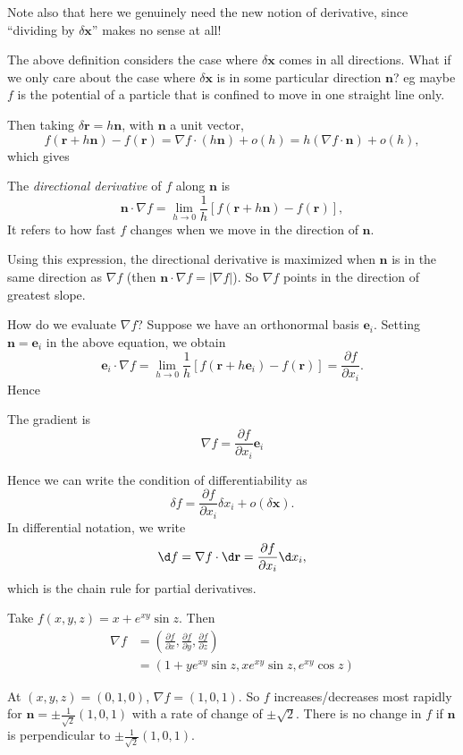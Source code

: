 \documentclass[a4paper]{article}
\begin{document}
Note also that here we genuinely need the new notion of derivative, since ``dividing by $\delta \mathbf{x}$'' makes no sense at all!

The above definition considers the case where $\delta \mathbf{x}$ comes in all directions. What if we only care about the case where $\delta \mathbf{x}$ is in some particular direction $\mathbf{n}$? eg maybe $f$ is the potential of a particle that is confined to move in one straight line only.

Then taking $\delta \mathbf{r} = h\mathbf{n}$, with $\mathbf{n}$ a unit vector,
\[
  f(\mathbf{r} + h\mathbf{n}) - f(\mathbf{r}) = \nabla f \cdot (h\mathbf{n}) + o(h) = h(\nabla f\cdot \mathbf{n}) + o(h),
\]
which gives
\begin{defi}
  The \emph{directional derivative} of $f$ along $\mathbf{n}$ is
  \[
    \mathbf{n}\cdot \nabla f = \lim_{h \to 0} \frac{1}{h}[f(\mathbf{r} + h\mathbf{n}) - f(\mathbf{r})],
  \]
  It refers to how fast $f$ changes when we move in the direction of $\mathbf{n}$.
\end{defi}
Using this expression, the directional derivative is maximized when $\mathbf{n}$ is in the same direction as $\nabla f$ (then $\mathbf{n}\cdot \nabla f = |\nabla f|$). So $\nabla f$ points in the direction of greatest slope.

How do we evaluate $\nabla f$? Suppose we have an orthonormal basis $\mathbf{e}_i$. Setting $\mathbf{n} = \mathbf{e}_i$ in the above equation, we obtain
\[
  \mathbf{e}_i \cdot \nabla f = \lim_{h\to 0} \frac{1}{h}[f(\mathbf{r} + h\mathbf{e}_i) - f(\mathbf{r})] = \frac{\partial f}{\partial x_i}.
\]
Hence 
\begin{thm}
  The gradient is
  \[
    \nabla f = \frac{\partial f}{\partial x_i}\mathbf{e}_i
  \]
\end{thm}

Hence we can write the condition of differentiability as
\[
  \delta f = \frac{\partial f}{\partial x_i}\delta x_i + o(\delta \mathbf{x}).
\]
In differential notation, we write
\[ 
  \d f = \nabla f\cdot \d \mathbf{r} = \frac{\partial f}{\partial x_i}\d x_i,
\]
which is the chain rule for partial derivatives.

\begin{eg}
  Take $f(x, y, z) = x + e^{xy}\sin z$. Then
  \begin{align*}
    \nabla f &= \left(\frac{\partial f}{\partial x}, \frac{\partial f}{\partial y}, \frac{\partial f}{\partial z}\right)\\
    &= (1 + ye^{xy}\sin z, xe^{xy}\sin z, e^{xy}\cos z)
  \end{align*}

  At  $(x, y, z) = (0, 1, 0)$, $\nabla f = (1, 0, 1)$. So $f$ increases/decreases most rapidly for $\mathbf{n} = \pm \frac{1}{\sqrt{2}}(1, 0, 1)$ with a rate of change of $\pm \sqrt{2}$. There is no change in $f$ if $\mathbf{n}$ is perpendicular to $\pm \frac{1}{\sqrt{2}}(1, 0, 1)$.
\end{eg}
\end{document}
